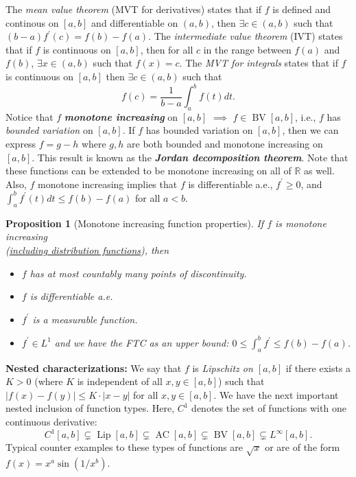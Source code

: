 \documentclass[12pt,reqno]{article}
\renewcommand{\emph}[1]{\textit{#1}}
\theoremstyle{plain}
\newtheorem{prop}[theorem]{Proposition}
\theoremstyle{definition}
\begin{document}
The \emph{mean value theorem} (MVT for derivatives) 
states that if $f$ is defined and continous on $[a,b]$ and 
differentiable on $(a,b)$, then $\exists c \in (a,b)$ such that 
$(b-a) f^{\prime}(c) = f(b) - f(a)$. The 
\emph{intermediate value theorem} (IVT) states that if $f$ is continuous on $[a,b]$, then for 
all $c$ in the range between $f(a)$ and $f(b)$, $\exists x \in (a, b)$ such that $f(x) = c$. 
The \emph{MVT for integrals} states that if $f$ is continuous on $[a,b]$ then $\exists c \in (a,b)$ 
such that $$f(c) = \frac{1}{b-a} \int_a^b f(t) dt.$$ 
Notice that $f$ \textbf{\emph{monotone increasing}} on 
$[a,b]$ $\implies$ $f \in \operatorname{BV}[a,b]$, i.e., $f$ has \emph{bounded variation} on $[a,b]$. 
If $f$ has bounded variation on $[a,b]$, then we can express $f = g-h$ where $g,h$ are both 
bounded and monotone increasing on $[a,b]$. This result is known as the 
\textbf{\emph{Jordan decomposition theorem}}. 
Note that these functions can be extended to 
be monotone increasing on all of $\mathbb{R}$ as well. 
Also, $f$ monotone increasing implies that $f$ is differentiable a.e., $f^{\prime} \geq 0$, and 
$\int_a^b f^{\prime}(t) dt \leq f(b)-f(a)$ for all $a < b$. 

\begin{prop}[Monotone increasing function properties]
If $f$ is \emph{monotone increasing} \\ (\underline{including distribution functions}), then 
\begin{itemize}
\item[(a)] $f$ has at most countably many points of discontinuity. 
\item[(b)] $f$ is differentiable a.e.
\item[(c)] $f^{\prime}$ is a measurable function.
\item[(d)] $f^{\prime} \in L^1$ and we have the FTC as an upper bound: 
     $0 \leq \int_a^b f^{\prime} \leq f(b) - f(a)$.
\end{itemize} 
\end{prop} 
\noindent 
\textbf{Nested characterizations:} 
We say that $f$ is \emph{Lipschitz on $[a,b]$} if there exists a $K > 0$ (where $K$ is 
independent of all $x,y \in [a,b]$) such that 
$|f(x)-f(y)| \leq K \cdot |x-y|$ for all $x,y \in [a,b]$. 
We have the next important nested inclusion of function types. Here, 
$C^1$ denotes the set of functions with one continuous derivative:
\[
C^1[a,b] \subsetneq \operatorname{Lip}[a,b] \subsetneq \operatorname{AC}[a,b] \subsetneq 
     \operatorname{BV}[a,b] \subsetneq L^{\infty}[a,b]. 
\] 
Typical counter examples to these types of functions are $\sqrt{x}$ or are of the form 
$f(x) = x^a \sin(1 / x^b)$. 
\end{document}
